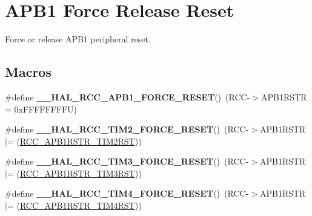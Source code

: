 \hypertarget{group___r_c_c___a_p_b1___force___release___reset}{\section{A\-P\-B1 Force Release Reset}
\label{group___r_c_c___a_p_b1___force___release___reset}
}


Force or release A\-P\-B1 peripheral reset.  


\subsection*{Macros}
\begin{DoxyCompactItemize}
\item 
\hypertarget{group___r_c_c___a_p_b1___force___release___reset_ga6f6e7048eca1abd1be132027f5b79465}{\#define {\bfseries \-\_\-\-\_\-\-H\-A\-L\-\_\-\-R\-C\-C\-\_\-\-A\-P\-B1\-\_\-\-F\-O\-R\-C\-E\-\_\-\-R\-E\-S\-E\-T}()~(R\-C\-C-\/$>$A\-P\-B1\-R\-S\-T\-R = 0x\-F\-F\-F\-F\-F\-F\-F\-F\-U)}\label{group___r_c_c___a_p_b1___force___release___reset_ga6f6e7048eca1abd1be132027f5b79465}

\item 
\hypertarget{group___r_c_c___a_p_b1___force___release___reset_ga1010b7c4a9122449860babb341f01d7b}{\#define {\bfseries \-\_\-\-\_\-\-H\-A\-L\-\_\-\-R\-C\-C\-\_\-\-T\-I\-M2\-\_\-\-F\-O\-R\-C\-E\-\_\-\-R\-E\-S\-E\-T}()~(R\-C\-C-\/$>$A\-P\-B1\-R\-S\-T\-R $\vert$= (\hyperlink{group___peripheral___registers___bits___definition_ga51ca4659706d0e00333d4abff049dc0d}{R\-C\-C\-\_\-\-A\-P\-B1\-R\-S\-T\-R\-\_\-\-T\-I\-M2\-R\-S\-T}))}\label{group___r_c_c___a_p_b1___force___release___reset_ga1010b7c4a9122449860babb341f01d7b}

\item 
\hypertarget{group___r_c_c___a_p_b1___force___release___reset_ga80ff127f3c25bde58ee5c1f224e2dca4}{\#define {\bfseries \-\_\-\-\_\-\-H\-A\-L\-\_\-\-R\-C\-C\-\_\-\-T\-I\-M3\-\_\-\-F\-O\-R\-C\-E\-\_\-\-R\-E\-S\-E\-T}()~(R\-C\-C-\/$>$A\-P\-B1\-R\-S\-T\-R $\vert$= (\hyperlink{group___peripheral___registers___bits___definition_ga8680c562fd372b494a160594525d7ce9}{R\-C\-C\-\_\-\-A\-P\-B1\-R\-S\-T\-R\-\_\-\-T\-I\-M3\-R\-S\-T}))}\label{group___r_c_c___a_p_b1___force___release___reset_ga80ff127f3c25bde58ee5c1f224e2dca4}

\item 
\hypertarget{group___r_c_c___a_p_b1___force___release___reset_ga16ff4de009e6cf02e8bfff068866837a}{\#define {\bfseries \-\_\-\-\_\-\-H\-A\-L\-\_\-\-R\-C\-C\-\_\-\-T\-I\-M4\-\_\-\-F\-O\-R\-C\-E\-\_\-\-R\-E\-S\-E\-T}()~(R\-C\-C-\/$>$A\-P\-B1\-R\-S\-T\-R $\vert$= (\hyperlink{group___peripheral___registers___bits___definition_ga6a720364de988965b6d2f91ed6519570}{R\-C\-C\-\_\-\-A\-P\-B1\-R\-S\-T\-R\-\_\-\-T\-I\-M4\-R\-S\-T}))}\label{group___r_c_c___a_p_b1___force___release___reset_ga16ff4de009e6cf02e8bfff068866837a}


\end{DoxyCompactItemize}
